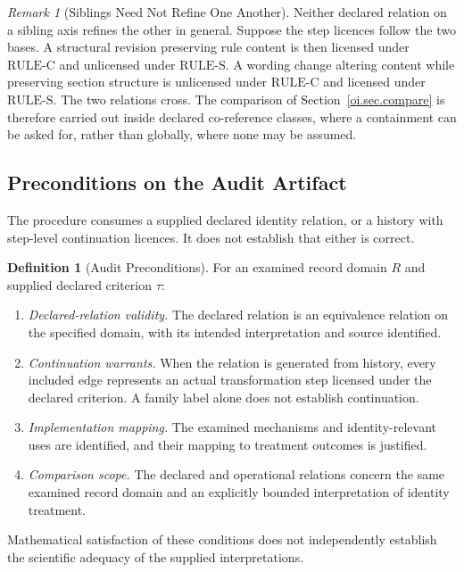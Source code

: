 \documentclass[11pt]{article}
\theoremstyle{plain}
\theoremstyle{definition}
\newtheorem{definition}[theorem]{Definition}
\theoremstyle{remark}
\newtheorem{remark}[theorem]{Remark}
\newcommand{\RULEC}{\ensuremath{\mathrm{RULE\text{-}C}}}
\newcommand{\RULES}{\ensuremath{\mathrm{RULE\text{-}S}}}
\begin{document}
\begin{remark}[Siblings Need Not Refine One Another]
  \label{oi.rem.norefine}
  Neither declared relation on a sibling axis refines the other in general.
  Suppose the step licences follow the two bases.
  A structural revision preserving rule content
  is then licensed under \RULEC{} and unlicensed under \RULES{}.
  A wording change altering content while preserving section structure
  is unlicensed under \RULEC{} and licensed under \RULES{}.
  The two relations cross.
  The comparison of Section~\ref{oi.sec.compare}
  is therefore carried out inside declared co-reference classes,
  where a containment can be asked for,
  rather than globally, where none may be assumed.
\end{remark}

\subsection{Preconditions on the Audit Artifact}

The procedure consumes a supplied declared identity relation,
or a history with step-level continuation licences.
It does not establish that either is correct.

\begin{definition}[Audit Preconditions]
  \label{oi.def.precond}
  For an examined record domain \(R\)
  and supplied declared criterion \(\tau\):
  \begin{enumerate}[label=(P\arabic*)]
    \item \emph{Declared-relation validity.}
          The declared relation is an equivalence relation
          on the specified domain, with its intended
          interpretation and source identified.

    \item \emph{Continuation warrants.}
          When the relation is generated from history,
          every included edge represents an actual
          transformation step licensed under the
          declared criterion. A family label alone
          does not establish continuation.

    \item \emph{Implementation mapping.}
          The examined mechanisms and identity-relevant
          uses are identified, and their mapping to
          treatment outcomes is justified.

    \item \emph{Comparison scope.}
          The declared and operational relations concern
          the same examined record domain and an explicitly
          bounded interpretation of identity treatment.
  \end{enumerate}

  Mathematical satisfaction of these conditions
  does not independently establish the scientific
  adequacy of the supplied interpretations.
\end{definition}
\end{document}
